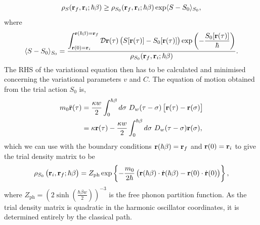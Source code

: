 \begin{equation}
    \rho_S(\vb{r}_f, \vb{r}_i; \hbar\beta) \geq \rho_{S_0}(\vb{r}_f, \vb{r}_i; \hbar\beta) \exp\langle S - S_0 \rangle_{S_0},
\label{eqn-223-8}
\end{equation}
where
\begin{equation}
     \langle S - S_0 \rangle_{S_0} = \frac{\displaystyle \int_{\vb{r}(0) = \vb{r}_i}^{\vb{r}(\hbar\beta) = \vb{r}_f} \mathcal{D} \vb{r}(\tau) \left(S[\vb{r}(\tau)] - S_0[\vb{r}(\tau)] \right)  \exp\left(-\frac{S_0[\vb{r}(\tau)]}{\hbar}\right)}{\displaystyle \rho_{S_0}(\vb{r}_f, \vb{r}_i; \hbar\beta)}.
\label{eqn-223-9}
\end{equation}
The RHS of the variational equation then has to be calculated and minimised concerning the variational parameters $v$ and $C$. The equation of motion obtained from the trial action $S_0$ is,
\begin{equation}
    \begin{aligned}
        m_0 \ddot{\vb{r}}(\tau) &= \frac{\kappa w}{2} \int^{\hbar\beta}_0 d\sigma\ D_w(\tau - \sigma) \left[ \vb{r}(\tau) - \vb{r}(\sigma) \right] \\
        &= \kappa \vb{r}(\tau) - \frac{\kappa w}{2} \int^{\hbar\beta}_0 d\sigma\ D_w(\tau - \sigma) \vb{r}(\sigma),
    \end{aligned}
\label{eqn-223-10}
\end{equation}
which we can use with the boundary conditions $\vb{r}(\hbar\beta) = \vb{r}_f$ and $\vb{r}(0) = \vb{r}_i$ to give the trial density matrix to be
\begin{equation}
    \rho_{S_0}\left(\vb{r}_i, \vb{r}_f; \hbar\beta\right) = Z_{\text{ph}} \exp \left\{-\frac{m_0}{2\hbar}\left( \vb{r}(\hbar\beta) \cdot \dot{\vb{r}}(\hbar\beta) - \vb{r}(0) \cdot \dot{\vb{r}}(0) \right)\right\},
\label{eqn-223-11}
\end{equation}
where $Z_{\text{ph}} = \left(2 \sinh\left(\frac{\hbar\beta w}{2}\right)\right)^{-3}$ is the free phonon partition function. As the trial density matrix is quadratic in the harmonic oscillator coordinates, it is determined entirely by the classical path. 


